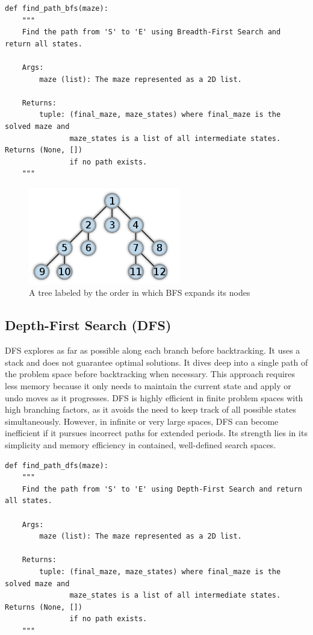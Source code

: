 \documentclass[final, journal, 11pt]{report}
\begin{document}
	
	\begin{lstlisting}
def find_path_bfs(maze):
    """
    Find the path from 'S' to 'E' using Breadth-First Search and return all states.

    Args:
        maze (list): The maze represented as a 2D list.

    Returns:
        tuple: (final_maze, maze_states) where final_maze is the solved maze and 
               maze_states is a list of all intermediate states. Returns (None, [])
               if no path exists.
    """
	\end{lstlisting}
	
		\begin{figure}[!htbp]
			\centering
			\includegraphics[width=2.6in]{assets/BFS.png}
			\caption{A tree labeled by the order in which BFS expands its nodes}
			\label{fig:BFS}
		\end{figure} 
		
	
	
	\subsection*{Depth-First Search (DFS)}
	DFS explores as far as possible along each branch before backtracking. It uses a stack and does not guarantee optimal solutions. It dives deep into a single path of the problem space before backtracking when necessary. This approach requires less memory because it only needs to maintain the current state and apply or undo moves as it progresses. DFS is highly efficient in finite problem spaces with high branching factors, as it avoids the need to keep track of all possible states simultaneously. However, in infinite or very large spaces, DFS can become inefficient if it pursues incorrect paths for extended periods. Its strength lies in its simplicity and memory efficiency in contained, well-defined search spaces.
	

	
	\begin{lstlisting}
def find_path_dfs(maze):
    """
    Find the path from 'S' to 'E' using Depth-First Search and return all states.

    Args:
        maze (list): The maze represented as a 2D list.

    Returns:
        tuple: (final_maze, maze_states) where final_maze is the solved maze and 
               maze_states is a list of all intermediate states. Returns (None, [])
               if no path exists.
    """
	\end{lstlisting}
	
\end{document}
